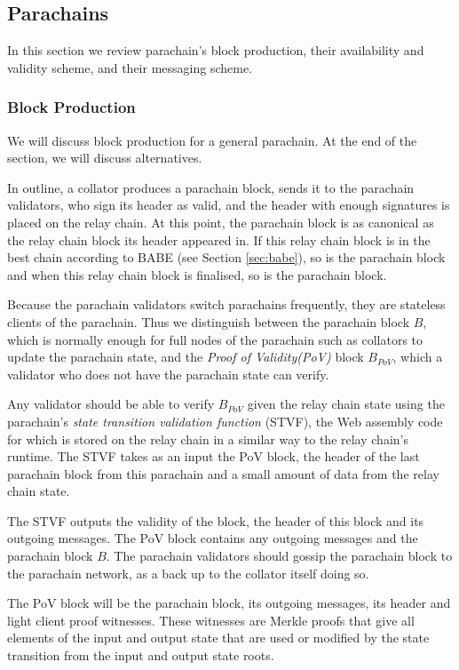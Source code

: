 \subsection{Parachains}\label{sec:parachains}
In this section we review parachain's block production, their availability and validity scheme, and their messaging scheme.
\subsubsection{Block Production}\label{sec:parachainblockproduction}

We will discuss block production for a general parachain. At the end of the section, we will discuss alternatives.

In outline, a collator produces a parachain block, sends it to the parachain validators,
who sign its header as valid, and the header with enough signatures is placed on the relay chain.
At this point, the parachain block is as canonical as the relay chain block its header appeared in.
If this relay chain block is in the best chain according to BABE (see Section \ref{sec:babe}), so is the parachain block and when this relay chain block is finalised, so is the parachain block.

Because the parachain validators switch parachains frequently, they are stateless clients of the parachain.
Thus we distinguish between the parachain block $B$, which is normally enough for full nodes of the parachain such as collators to update the parachain state,
and the {\em Proof of Validity(PoV)} block $B_{PoV}$, which a validator who does not have the parachain state can verify.

Any validator should be able to verify $B_{PoV}$ given the relay chain state using the parachain's {\em state transition validation function} (STVF),
the Web assembly code for which is stored on the relay chain in a similar way to the relay chain's runtime.
The STVF takes as an input the PoV block, the header of the last parachain block from this parachain and a small amount of data from the relay chain state.
	
The STVF outputs the validity of the block, the header of this block and its outgoing messages.
The PoV block contains any outgoing messages and the parachain block $B$. The parachain validators should gossip the parachain block to the parachain network, as a back up to the collator itself doing so.

The PoV block will be the parachain block, its outgoing messages, its header and light client proof witnesses. These witnesses are Merkle proofs that give all elements of the input and output state that are used or modified by the state transition from the input and output state roots.


